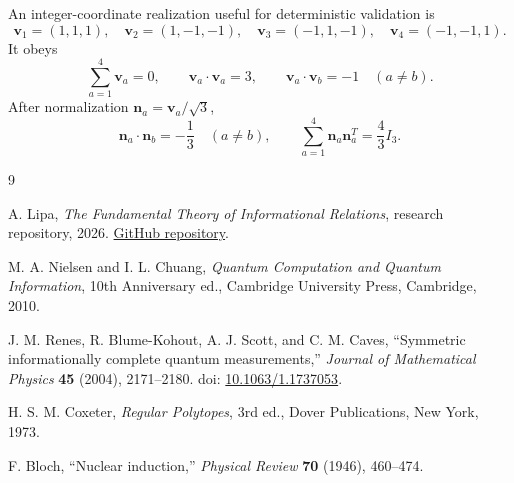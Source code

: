 \documentclass[12pt,a4paper]{article}
\newcommand{\nvec}{\bm{n}}
\newcommand{\vvec}{\bm{v}}
\begin{document}
An integer-coordinate realization useful for deterministic validation is
\[
\vvec_1=(1,1,1),\quad
\vvec_2=(1,-1,-1),\quad
\vvec_3=(-1,1,-1),\quad
\vvec_4=(-1,-1,1).
\]
It obeys
\[
\sum_{a=1}^{4}\vvec_a=0,
\qquad
\vvec_a\cdot\vvec_a=3,
\qquad
\vvec_a\cdot\vvec_b=-1\quad(a\ne b).
\]
After normalization $\nvec_a=\vvec_a/\sqrt3$,
\[
\nvec_a\cdot\nvec_b=-\frac13\quad(a\ne b),
\qquad
\sum_{a=1}^{4}\nvec_a\nvec_a^T=\frac43I_3.
\]

\begin{thebibliography}{9}

A. Lipa,
\emph{The Fundamental Theory of Informational Relations},
research repository, 2026.
\newblock \href{https://github.com/AdrianLipa90/The-Fundamental-Theory-of-Informational-Relations}{GitHub repository}.

M. A. Nielsen and I. L. Chuang,
\emph{Quantum Computation and Quantum Information},
10th Anniversary ed., Cambridge University Press, Cambridge, 2010.

J. M. Renes, R. Blume-Kohout, A. J. Scott, and C. M. Caves,
``Symmetric informationally complete quantum measurements,''
\emph{Journal of Mathematical Physics} \textbf{45} (2004), 2171--2180.
\newblock doi: \href{https://doi.org/10.1063/1.1737053}{10.1063/1.1737053}.

H. S. M. Coxeter,
\emph{Regular Polytopes}, 3rd ed.,
Dover Publications, New York, 1973.

F. Bloch,
``Nuclear induction,''
\emph{Physical Review} \textbf{70} (1946), 460--474.

\end{thebibliography}
\end{document}
